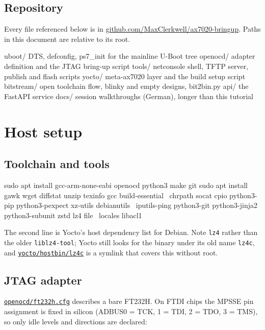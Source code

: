 \documentclass[11pt,a4paper,oneside]{article}
\newcommand{\cmd}[1]{\texttt{#1}}
\newcommand{\repo}{https://github.com/MaxClerkwell/ax7020-bringup}
\newcommand{\rfile}[1]{\href{\repo/blob/master/#1}{\color{bluemid}\nolinkurl{#1}}}
\begin{document}
\subsection{Repository}

Every file referenced below is in \href{\repo}{github.com/MaxClerkwell/ax7020-bringup}.
Paths in this document are relative to its root.

\begin{code}
uboot/          DTS, defconfig, ps7_init for the mainline U-Boot tree
openocd/        adapter definition and the JTAG bring-up script
tools/          netconsole shell, TFTP server, publish and flash scripts
yocto/          meta-ax7020 layer and the build setup script
bitstream/      open toolchain flow, blinky and empty designs, bit2bin.py
api/            the FastAPI service
docs/           session walkthroughs (German), longer than this tutorial
\end{code}

\section{Host setup}

\subsection{Toolchain and tools}

\begin{shell}
sudo apt install gcc-arm-none-eabi openocd python3 make git
sudo apt install gawk wget diffstat unzip texinfo gcc build-essential \
    chrpath socat cpio python3-pip python3-pexpect xz-utils debianutils \
    iputils-ping python3-git python3-jinja2 python3-subunit zstd lz4 file \
    locales libacl1
\end{shell}

The second line is Yocto's host dependency list for Debian. Note \cmd{lz4}
rather than the older \cmd{liblz4-tool}; Yocto still looks for the binary
under its old name \cmd{lz4c}, and \rfile{yocto/hostbin/lz4c} is a symlink
that covers this without root.

\subsection{JTAG adapter}

\rfile{openocd/ft232h.cfg} describes a bare FT232H. On FTDI chips the MPSSE
pin assignment is fixed in silicon (ADBUS0 = TCK, 1 = TDI, 2 = TDO, 3 = TMS),
so only idle levels and directions are declared:
\end{document}
